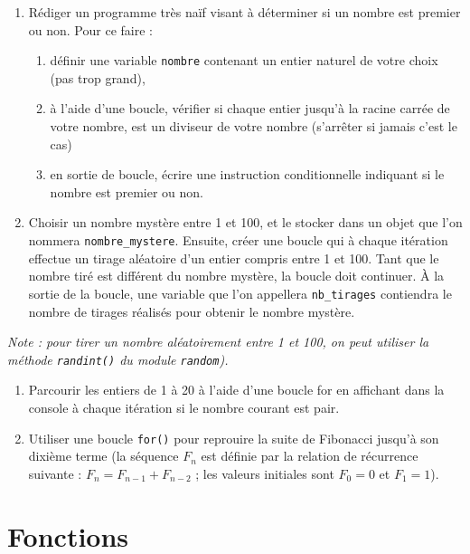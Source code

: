 \documentclass[12pt,]{book}
\providecommand{\tightlist}{%
  \setlength{\itemsep}{0pt}\setlength{\parskip}{0pt}}
\numberwithin{equation}{section}
\numberwithin{countremarque}{section}
\let\BeginKnitrBlock\begin \let\EndKnitrBlock\end
\begin{document}
\BeginKnitrBlock{exframe}
\begin{enumerate}
\def\labelenumi{\arabic{enumi}.}
\item
  Rédiger un programme très naïf visant à déterminer si un nombre est
  premier ou non. Pour ce faire :

  \begin{enumerate}
  \def\labelenumii{\arabic{enumii}.}
  \tightlist
  \item
    définir une variable \texttt{nombre} contenant un entier naturel de
    votre choix (pas trop grand),
  \item
    à l'aide d'une boucle, vérifier si chaque entier jusqu'à la racine
    carrée de votre nombre, est un diviseur de votre nombre (s'arrêter
    si jamais c'est le cas)
  \item
    en sortie de boucle, écrire une instruction conditionnelle indiquant
    si le nombre est premier ou non.
  \end{enumerate}
\item
  Choisir un nombre mystère entre 1 et 100, et le stocker dans un objet
  que l'on nommera \texttt{nombre\_mystere}. Ensuite, créer une boucle
  qui à chaque itération effectue un tirage aléatoire d'un entier
  compris entre 1 et 100. Tant que le nombre tiré est différent du
  nombre mystère, la boucle doit continuer. À la sortie de la boucle,
  une variable que l'on appellera \texttt{nb\_tirages} contiendra le
  nombre de tirages réalisés pour obtenir le nombre mystère.
\end{enumerate}

\emph{Note : pour tirer un nombre aléatoirement entre 1 et 100, on peut
utiliser la méthode \texttt{randint()} du module \texttt{random}).}

\begin{enumerate}
\def\labelenumi{\arabic{enumi}.}
\setcounter{enumi}{2}
\tightlist
\item
  Parcourir les entiers de 1 à 20 à l'aide d'une boucle for en affichant
  dans la console à chaque itération si le nombre courant est pair.
\item
  Utiliser une boucle \texttt{for()} pour reprouire la suite de
  Fibonacci jusqu'à son dixième terme (la séquence \(F_n\) est définie
  par la relation de récurrence suivante : \(F_n = F_{n-1} + F_{n-2}\) ;
  les valeurs initiales sont \(F_0 = 0\) et \(F_1 = 1\)).
\end{enumerate}
\EndKnitrBlock{exframe}

\chapter{Fonctions}\label{fonctions}
\end{document}
